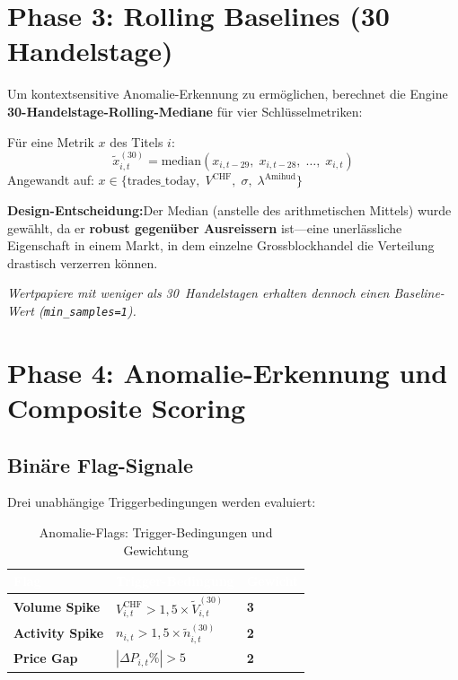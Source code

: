 \documentclass[11pt, a4paper, oneside, openany]{report}
\newcommand{\code}[1]{\texttt{\small\textcolor{DeepNavy}{#1}}}
\begin{document}
\section{Phase 3: Rolling Baselines (30 Handelstage)}

Um kontextsensitive Anomalie-Erkennung zu ermöglichen, berechnet die Engine \textbf{30-Handelstage-Rolling-Mediane} für vier Schlüsselmetriken:

\begin{mathbox}
Für eine Metrik $x$ des Titels $i$:
\[
  \tilde{x}_{i,t}^{(30)} = \text{median}\!\left(x_{i,t-29},\; x_{i,t-28},\; \ldots,\; x_{i,t}\right)
\]
Angewandt auf: $x \in \{\text{trades\_today},\; V^{\text{CHF}},\; \sigma,\; \lambda^{\text{Amihud}}\}$

\textbf{Design-Entscheidung:}\;Der Median (anstelle des arithmetischen Mittels) wurde gewählt, da er \textbf{robust gegenüber Ausreissern} ist\;---\;eine unerlässliche Eigenschaft in einem Markt, in dem einzelne Grossblockhandel die Verteilung drastisch verzerren können.

\textit{Wertpapiere mit weniger als 30~Handelstagen erhalten dennoch einen Baseline-Wert (\code{min\_samples=1}).}
\end{mathbox}

\section{Phase 4: Anomalie-Erkennung und Composite Scoring}

\subsection{Binäre Flag-Signale}

Drei unabhängige Triggerbedingungen werden evaluiert:

\begin{table}[H]
\centering
\caption{Anomalie-Flags: Trigger-Bedingungen und Gewichtung}
\label{tab:flags}
\sffamily\small
\begin{tabularx}{\textwidth}{>{\bfseries\sffamily}p{3cm} X >{\centering\arraybackslash}p{1.5cm}}
  \toprule
  \rowcolor{DeepNavy} \textcolor{white}{\textbf{Flag}} & \textcolor{white}{\textbf{Trigger-Bedingung}} & \textcolor{white}{\textbf{Gewicht}} \\
  \midrule
  Volume Spike    & $V_{i,t}^{\text{CHF}} > 1{,}5 \times \tilde{V}_{i,t}^{(30)}$ & \textbf{3} \\
  Activity Spike  & $n_{i,t} > 1{,}5 \times \tilde{n}_{i,t}^{(30)}$               & \textbf{2} \\
  Price Gap       & $|\Delta P_{i,t}\%| > 5$                                       & \textbf{2} \\
  \bottomrule
\end{tabularx}
\end{table}
\end{document}
